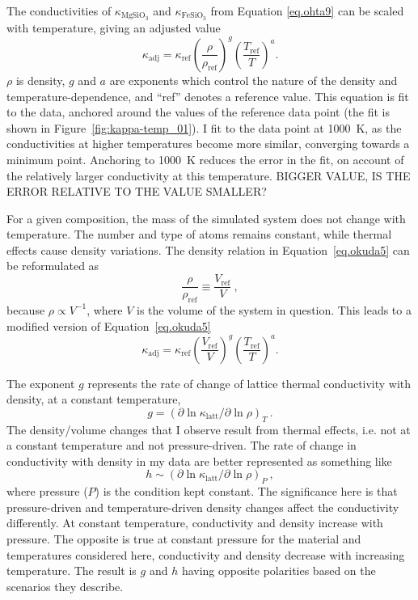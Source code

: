The conductivities of $\kappa_{\mathrm{MgSiO_{3}}}$ and $\kappa_{\mathrm{FeSiO_{3}}}$ from Equation \ref{eq.ohta9} can be scaled with temperature, giving an adjusted value 
%
\begin{equation}
\kappa_{\mathrm{adj}}=\kappa_{\mathrm{ref}}\left ( \frac{\rho}{\rho_{\mathrm{ref}}} \right )^{g}\left ( \frac{T_{\mathrm{ref}}}{T} \right )^{a}.
\label{eq.okuda5}
\end{equation}
%
$\rho$ is density, $g$ and $a$ are exponents which control the nature of the density and temperature-dependence, and ``ref'' denotes a reference value. This equation is fit to the data, anchored around the values of the reference data point (the fit is shown in Figure~\ref{fig:kappa-temp_01}). I fit to the data point at 1000~K, as the conductivities at higher temperatures become more similar, converging towards a minimum point. Anchoring to 1000~K reduces the error in the fit, on account of the relatively larger conductivity at this temperature. BIGGER VALUE, IS THE ERROR RELATIVE TO THE VALUE SMALLER?

For a given composition, the mass of the simulated system does not change with temperature. The number and type of atoms remains constant, while thermal effects cause density variations. The density relation in Equation~\ref{eq.okuda5} can be reformulated as
%
\begin{equation}
\frac{\rho }{\rho _{\mathrm{ref}}} \equiv \frac{V_{\mathrm{ref}}}{V} \ ,
\label{eq.rho_to_vol}
\end{equation}
%
because $\rho \propto V^{-1}$, where $V$ is the volume of the system in question. This leads to a modified version of Equation~\ref{eq.okuda5}
%
\begin{equation}
\kappa_{\mathrm{adj}}=\kappa_{\mathrm{ref}}\left ( \frac{V_{\mathrm{ref}}}{V} \right )^{g}\left ( \frac{T_{\mathrm{ref}}}{T} \right )^{a}.
\label{eq.okuda5mod}
\end{equation}

The exponent $g$ represents the rate of change of lattice thermal conductivity with density, at a constant temperature,
%
\begin{equation}
g=\left( \partial \ln \kappa_{\mathrm{latt}} / \partial \ln \rho \right) _{T} \ .
\label{eq.g_def}
\end{equation}
%
The density/volume changes that I observe result from thermal effects, i.e. not at a constant temperature and not pressure-driven. The rate of change in conductivity with density in my data are better represented as something like 
%
\begin{equation}
h \sim \left( \partial \ln \kappa_{\mathrm{latt}} / \partial \ln \rho \right) _{P} \ ,
\label{eq.g_def}
\end{equation}
%
where pressure ($P$) is the condition kept constant. The significance here is that pressure-driven and temperature-driven density changes affect the conductivity differently. At constant temperature, conductivity and density increase with pressure. The opposite is true at constant pressure for the material and temperatures considered here, conductivity and density decrease with increasing temperature. The result is $g$ and $h$ having opposite polarities based on the scenarios they describe.

